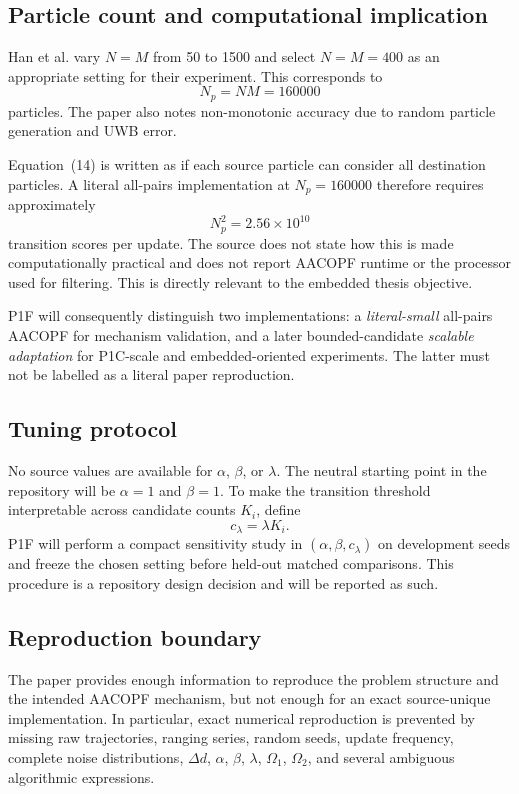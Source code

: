 \subsection{Particle count and computational implication}
Han et al. vary $N=M$ from 50 to 1500 and select $N=M=400$ as an appropriate setting for their experiment. This corresponds to
\begin{equation}
    N_p=NM=160000
\end{equation}
particles. The paper also notes non-monotonic accuracy due to random particle generation and UWB error.

Equation~(14) is written as if each source particle can consider all destination particles. A literal all-pairs implementation at $N_p=160000$ therefore requires approximately
\begin{equation}
    N_p^2=2.56\times10^{10}
\end{equation}
transition scores per update. The source does not state how this is made computationally practical and does not report AACOPF runtime or the processor used for filtering. This is directly relevant to the embedded thesis objective.

P1F will consequently distinguish two implementations: a \emph{literal-small} all-pairs AACOPF for mechanism validation, and a later bounded-candidate \emph{scalable adaptation} for P1C-scale and embedded-oriented experiments. The latter must not be labelled as a literal paper reproduction.

\subsection{Tuning protocol}
No source values are available for $\alpha$, $\beta$, or $\lambda$. The neutral starting point in the repository will be $\alpha=1$ and $\beta=1$. To make the transition threshold interpretable across candidate counts $K_i$, define
\begin{equation}
    c_\lambda=\lambda K_i.
\end{equation}
P1F will perform a compact sensitivity study in $(\alpha,\beta,c_\lambda)$ on development seeds and freeze the chosen setting before held-out matched comparisons. This procedure is a repository design decision and will be reported as such.

\subsection{Reproduction boundary}
The paper provides enough information to reproduce the problem structure and the intended AACOPF mechanism, but not enough for an exact source-unique implementation. In particular, exact numerical reproduction is prevented by missing raw trajectories, ranging series, random seeds, update frequency, complete noise distributions, $\Delta d$, $\alpha$, $\beta$, $\lambda$, $\Omega_1$, $\Omega_2$, and several ambiguous algorithmic expressions.

